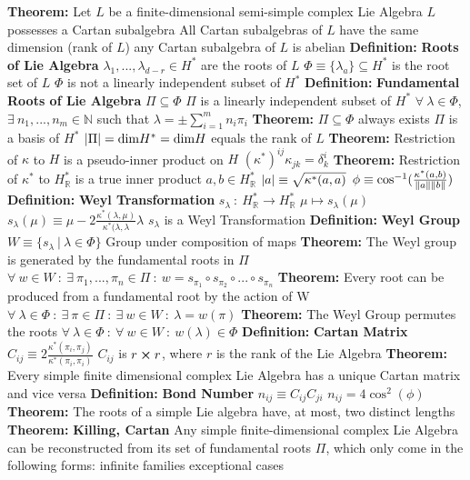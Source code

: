 \documentclass[14pt]{extarticle}
\def\Definition{{\color{blue} \textbf{Definition:} }}
\def\Theorem{{\color{red} \textbf{Theorem:} }}
\begin{document}
\begin{outline}
		\1	\Theorem Let $L$ be a finite-dimensional semi-simple complex Lie Algebra
			\2	$L$ possesses a Cartan subalgebra
			\2	All Cartan subalgebras of $L$ have the same dimension (rank of $L$)
			\2	any Cartan subalgebra of $L$ is abelian
		\1	\Definition \textbf{Roots of Lie Algebra}
			\2	$\lambda_1,...,\lambda_{d-r} \in H^*$ are the roots of $L$
			\2	$\Phi \equiv \{\lambda_a\} \subseteq H^*$ is the root set of $L$
			\2	$\Phi$ is not a linearly independent subset of $H^*$
		\1	\Definition \textbf{Fundamental Roots of Lie Algebra}
			\2	$\Pi \subseteq \Phi$
			\2	$\Pi$ is a linearly independent subset of $H^*$
			\2	$\forall~\lambda \in \Phi$, $\exists~n_1,...,n_m \in \mathbb{N}$ such that
					$\lambda = \pm \sum_{i=1}^m n_i \pi_i$
			\2	\Theorem
				\3	$\Pi \subseteq \Phi$ always exists
				\3	$\Pi$ is a basis of $H^*$
				\3	$\abs{\Pi} = \text{dim}H^* = \text{dim}H$ equals the rank of $L$
		\1	\Theorem Restriction of $\kappa$ to $H$ is a pseudo-inner product on $H$
			\2	$(\kappa^*)^{ij}\kappa_{jk} = \delta^i_k$
		\1	\Theorem Restriction of $\kappa^*$ to $H^*_{\mathbb{R}}$ is a true inner product
			\2	$a,b \in H^*_{\mathbb{R}}$
			\2	$\abs{a} \equiv \sqrt{\kappa^*(a,a)}$
			\2	$\phi \equiv \cos^{-1}(\frac{\kappa^*(a,b)}{\norm{a}\norm{b}})$
		\1	\Definition \textbf{Weyl Transformation}
			\2	$s_{\lambda}~:~H^*_{\mathbb{R}} \rightarrow H^*_{\mathbb{R}}$
			\2	$\mu \mapsto s_{\lambda}(\mu)$
			\2	$s_{\lambda}(\mu) \equiv \mu - 2 \frac{\kappa^*(\lambda,\mu)}{\kappa^*(\lambda,\lambda}\lambda$
			\2	$s_{\lambda}$ is a Weyl Transformation
			\2	\Definition \textbf{Weyl Group}
				\3	$W \equiv \{s_{\lambda}~|~\lambda \in \Phi\}$
				\3	Group under composition of maps
				\3	\Theorem The Weyl group is generated by the fundamental roots in $\Pi$
					\4	$\forall~w \in W~:~\exists~\pi_1,...,\pi_n \in \Pi~:~
								w = s_{\pi_1} \circ s_{\pi_2} \circ ... \circ s_{\pi_n}$
				\3	\Theorem Every root can be produced from a fundamental root by the
						action of W
					\4	$\forall~\lambda \in \Phi~:~\exists~\pi \in \Pi~:~\exists~w \in W~:~ \lambda = w(\pi)$
				\3	\Theorem The Weyl Group permutes the roots
					\4	$\forall~\lambda \in \Phi~:~\forall~w \in W~:~w(\lambda) \in \Phi$
		\1	\Definition \textbf{Cartan Matrix}
			\2	$C_{ij} \equiv 2 \frac{\kappa^*(\pi_i,\pi_j)}{\kappa^*(\pi_i,\pi_i)}$
			\2	$C_{ij}$ is $r \cross r$, where $r$ is the rank of the Lie Algebra
			\2	\Theorem Every simple finite dimensional complex Lie Algebra has a 
					unique Cartan matrix and vice versa
		\1	\Definition \textbf{Bond Number}
			\2	$n_{ij} \equiv C_{ij}C_{ji}$
			\2	$n_{ij} = 4 \cos^2(\phi)$
		\1	\Theorem The roots of a simple Lie algebra have, at most, two distinct
				lengths
		\1	\Theorem \textbf{Killing, Cartan}
			\2	Any simple finite-dimensional complex Lie Algebra can be reconstructed
					from its set of fundamental roots $\Pi$, which only come in the following
					forms:
				 infinite families
				 exceptional cases	

\end{outline}
\end{document}
